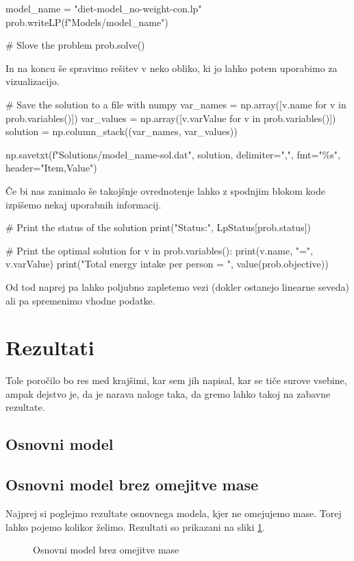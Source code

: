 \documentclass[a4paper]{article}
\begin{document}
\begin{pythonlst}
    model_name = "diet-model_no-weight-con.lp"
    prob.writeLP(f"Models/{model_name}")

    # Slove the problem
    prob.solve()
\end{pythonlst}

In na koncu še spravimo rešitev v neko obliko, ki jo lahko potem uporabimo za vizualizacijo.

\begin{pythonlst}
    # Save the solution to a file with numpy
    var_names = np.array([v.name for v in prob.variables()])
    var_values = np.array([v.varValue for v in prob.variables()])
    solution = np.column_stack((var_names, var_values))

    np.savetxt(f"Solutions/{model_name}-sol.dat", solution, delimiter=",", fmt="\%s", header="Item,Value")
\end{pythonlst}

Če bi nas zanimalo še takojšnje ovrednotenje lahko z spodnjim blokom kode izpišemo nekaj uporabnih
informacij.

\begin{pythonlst}
    # Print the status of the solution
    print("Status:", LpStatus[prob.status])

    # Print the optimal solution
    for v in prob.variables():
        print(v.name, "=", v.varValue)
    print("Total energy intake per person = ", value(prob.objective))
\end{pythonlst}

Od tod naprej pa lahko poljubno zapletemo vezi (dokler ostanejo linearne seveda) ali pa spremenimo
vhodne podatke. \\

\section{Rezultati}
Tole poročilo bo res med krajšimi, kar sem jih napisal, kar se tiče surove vsebine, ampak 
dejstvo je, da je narava naloge taka, da gremo lahko takoj na zabavne rezultate. \\

\subsection{Osnovni model}
\subsection{Osnovni model brez omejitve mase}
Najprej si poglejmo rezultate osnovnega modela, kjer ne omejujemo mase. Torej lahko pojemo kolikor
želimo. Rezultati so prikazani na sliki \ref{fig:basic-no-mass}. \\
\begin{figure}[H]
    \centering
    \caption{Osnovni model brez omejitve mase}
    \label{fig:basic-no-mass}
\end{figure}
\end{document}
